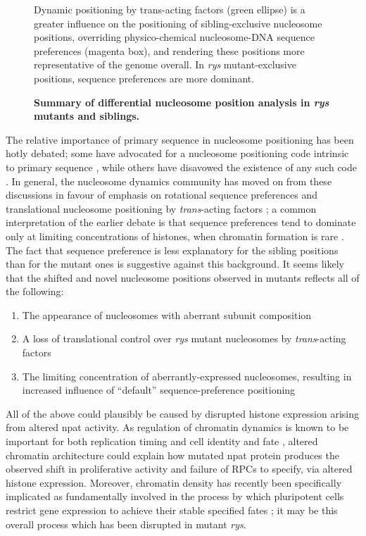 \begin{figure}
    \caption{{\bf Summary of differential nucleosome position analysis in \textit{rys} mutants and siblings.}} Dynamic positioning by trans-acting factors (green ellipse) is a greater influence on the positioning of sibling-exclusive nucleosome positions, overriding physico-chemical nucleosome-DNA sequence preferences (magenta box), and rendering these positions more representative of the genome overall. In \textit{rys} mutant-exclusive positions, sequence preferences are more dominant.
    \label{fig:rysschematic}
\end{figure}


The relative importance of primary sequence in nucleosome positioning has been hotly debated; some have advocated for a nucleosome positioning code intrinsic to primary sequence \cite{Kaplan2009}, while others have disavowed the existence of any such code \cite{Zhang2009}. In general, the nucleosome dynamics community has moved on from these discussions in favour of emphasis on rotational sequence preferences \cite{Tolstorukov2007} and translational nucleosome positioning by \textit{trans}-acting factors \cite{Klages-Mundt2018}; a common interpretation of the earlier debate is that sequence preferences tend to dominate only at limiting concentrations of histones, when chromatin formation is rare \cite{Pointner2013}. The fact that sequence preference is less explanatory for the sibling positions than for the mutant ones is suggestive against this background. It seems likely that the shifted and novel nucleosome positions observed in mutants reflects all of the following:

\begin{enumerate}
    \item The appearance of nucleosomes with aberrant subunit composition
    \item A loss of translational control over \textit{rys} mutant nucleosomes by \textit{trans}-acting factors
    \item The limiting concentration of aberrantly-expressed nucleosomes, resulting in increased influence of ``default'' sequence-preference positioning
\end{enumerate}

All of the above could plausibly be caused by disrupted histone expression arising from altered npat activity. As regulation of chromatin dynamics is known to be important for both replication timing \cite{Gilbert2010} and cell identity and fate \cite{Serrano2013}, altered chromatin architecture could explain how mutated npat protein produces the observed shift in proliferative activity and failure of RPCs to specify, via altered histone expression. Moreover, chromatin density has recently been specifically implicated as fundamentally involved in the process by which pluripotent cells restrict gene expression to achieve their stable specified fates \cite{Golkaram2017}; it may be this overall process which has been disrupted in mutant \textit{rys}.

